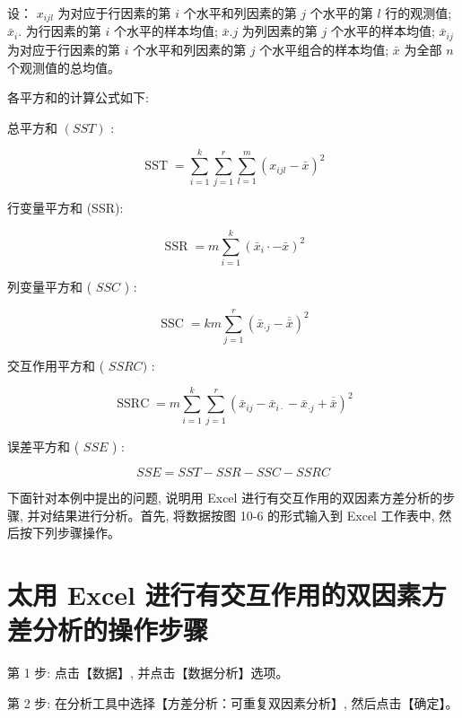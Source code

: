 \documentclass[10pt]{article}
\begin{document}
\begin{CJK*}{UTF8}{bsmi}
设： $x_{i j l}$ 为对应于行因素的第 $i$ 个水平和列因素的第 $j$ 个水平的第 $l$ 行的观测值; $\bar{x}_{i}$. 为行因素的第 $i$ 个水平的样本均值; $\bar{x} . j$ 为列因素的第 $j$ 个水平的样本均值; $\bar{x}_{i j}$ 为对应于行因素的第 $i$ 个水平和列因素的第 $j$ 个水平组合的样本均值; $\bar{x}$ 为全部 $n$ 个观测值的总均值。

各平方和的计算公式如下:

总平方和 $(S S T)$ :


\begin{equation*}
\operatorname{SST}=\sum_{i=1}^{k} \sum_{j=1}^{r} \sum_{l=1}^{m}\left(x_{i j l}-\bar{x}\right)^{2} \tag{10.26}
\end{equation*}


行变量平方和 (SSR):


\begin{equation*}
\operatorname{SSR}=m \sum_{i=1}^{k}\left(\bar{x}_{i} \cdot-\bar{x}\right)^{2} \tag{10.27}
\end{equation*}


列变量平方和 ( $S S C$ ) :


\begin{equation*}
\operatorname{SSC}=k m \sum_{j=1}^{r}\left(\bar{x}_{\cdot j}-\overline{\bar{x}}\right)^{2} \tag{10.28}
\end{equation*}


交互作用平方和 ( $S S R C)$ :


\begin{equation*}
\operatorname{SSRC}=m \sum_{i=1}^{k} \sum_{j=1}^{r}\left(\bar{x}_{i j}-\bar{x}_{i \cdot}-\bar{x}_{\cdot j}+\overline{\bar{x}}\right)^{2} \tag{10.29}
\end{equation*}


误差平方和 ( $S S E$ ) :


\begin{equation*}
S S E=S S T-S S R-S S C-S S R C \tag{10.30}
\end{equation*}


下面针对本例中提出的问题, 说明用 Excel 进行有交互作用的双因素方差分析的步骤, 并对结果进行分析。首先, 将数据按图 10-6 的形式输入到 Excel 工作表中, 然后按下列步骤操作。

\section*{太用 Excel 进行有交互作用的双因素方差分析的操作步骤}
第 1 步: 点击【数据】, 并点击【数据分析】选项。

第 2 步: 在分析工具中选择【方差分析：可重复双因素分析】, 然后点击【确定】。


\end{CJK*}
\end{document}
